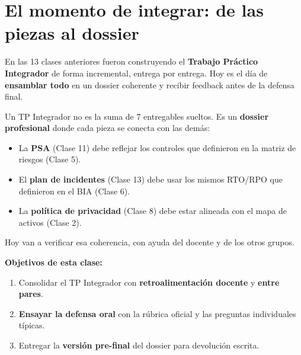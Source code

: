 \documentclass[12pt,a4paper]{article}
\begin{document}
\tableofcontents
\newpage

\section{El momento de integrar: de las piezas al dossier}

En las 13 clases anteriores fueron construyendo el \textbf{Trabajo Pr\'actico Integrador} de forma incremental, entrega por entrega. Hoy es el d\'ia de \textbf{ensamblar todo} en un dossier coherente y recibir feedback antes de la defensa final.

\begin{cajaNota}[title={¿Por qu\'e es cr\'itica esta clase?}]
Un TP Integrador no es la suma de 7 entregables sueltos. Es un \textbf{dossier profesional} donde cada pieza se conecta con las dem\'as:
\begin{itemize}[leftmargin=2em]
    \item La \textbf{PSA} (Clase 11) debe reflejar los controles que definieron en la matriz de riesgos (Clase 5).
    \item El \textbf{plan de incidentes} (Clase 13) debe usar los mismos RTO/RPO que definieron en el BIA (Clase 6).
    \item La \textbf{pol\'itica de privacidad} (Clase 8) debe estar alineada con el mapa de activos (Clase 2).
\end{itemize}
Hoy van a verificar esa coherencia, con ayuda del docente y de los otros grupos.
\end{cajaNota}

\vspace{6pt}
\noindent\textbf{Objetivos de esta clase:}
\begin{enumerate}[leftmargin=2em]
  \item Consolidar el TP Integrador con \textbf{retroalimentaci\'on docente} y \textbf{entre pares}.
  \item \textbf{Ensayar la defensa oral} con la r\'ubrica oficial y las preguntas individuales t\'ipicas.
  \item Entregar la \textbf{versi\'on pre-final} del dossier para devoluci\'on escrita.
\end{enumerate}

\newpage
\end{document}
